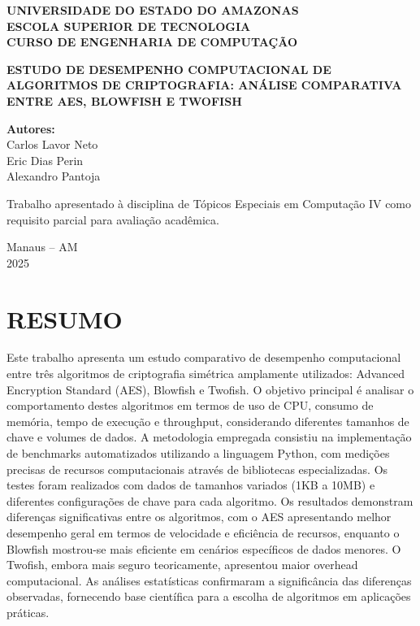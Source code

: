 \documentclass[12pt,a4paper,oneside]{article}
\begin{document}
\begin{titlepage}
\centering
\vspace*{1cm}

{\fontsize{14}{16}\selectfont\bfseries\uppercase{Universidade do Estado do Amazonas}}\\
{\fontsize{14}{16}\selectfont\bfseries\uppercase{Escola Superior de Tecnologia}}\\
{\fontsize{14}{16}\selectfont\bfseries\uppercase{Curso de Engenharia de Computação}}\\

\vspace{4cm}

{\fontsize{14}{16}\selectfont\bfseries\uppercase{Estudo de Desempenho Computacional de Algoritmos de Criptografia: Análise Comparativa entre AES, Blowfish e Twofish}}

\vspace{4cm}

{\fontsize{12}{14}\selectfont
\textbf{Autores:}\\
Carlos Lavor Neto\\
Eric Dias Perin\\
Alexandro Pantoja\\
}

\vspace{2cm}

{\fontsize{12}{14}\selectfont
Trabalho apresentado à disciplina de Tópicos Especiais em Computação IV como requisito parcial para avaliação acadêmica.
}

\vfill

{\fontsize{12}{14}\selectfont
Manaus -- AM\\
2025
}

\end{titlepage}

\newpage
\section*{RESUMO}

Este trabalho apresenta um estudo comparativo de desempenho computacional entre três algoritmos de criptografia simétrica amplamente utilizados: Advanced Encryption Standard (AES), Blowfish e Twofish. O objetivo principal é analisar o comportamento destes algoritmos em termos de uso de CPU, consumo de memória, tempo de execução e throughput, considerando diferentes tamanhos de chave e volumes de dados. A metodologia empregada consistiu na implementação de benchmarks automatizados utilizando a linguagem Python, com medições precisas de recursos computacionais através de bibliotecas especializadas. Os testes foram realizados com dados de tamanhos variados (1KB a 10MB) e diferentes configurações de chave para cada algoritmo. Os resultados demonstram diferenças significativas entre os algoritmos, com o AES apresentando melhor desempenho geral em termos de velocidade e eficiência de recursos, enquanto o Blowfish mostrou-se mais eficiente em cenários específicos de dados menores. O Twofish, embora mais seguro teoricamente, apresentou maior overhead computacional. As análises estatísticas confirmaram a significância das diferenças observadas, fornecendo base científica para a escolha de algoritmos em aplicações práticas.
\end{document}
